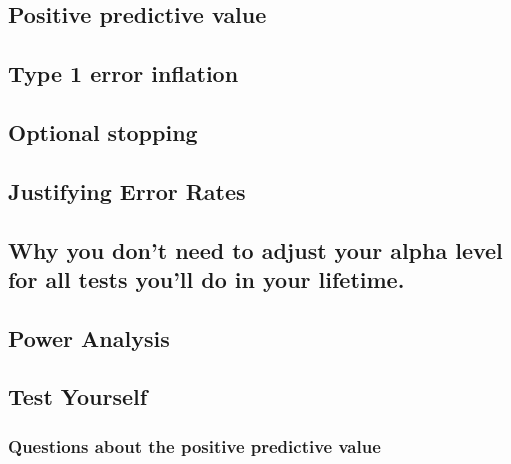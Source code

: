 \documentclass[
  oneside]{krantz}
\begin{document}
\hypertarget{ppv}{%
\subsection{Positive predictive value}\label{ppv}}

\hypertarget{type-1-error-inflation}{%
\subsection{Type 1 error inflation}\label{type-1-error-inflation}}

\hypertarget{optionalstopping}{%
\subsection{Optional stopping}\label{optionalstopping}}

\hypertarget{justifyerrorrate}{%
\subsection{Justifying Error Rates}\label{justifyerrorrate}}

\hypertarget{why-you-dont-need-to-adjust-your-alpha-level-for-all-tests-youll-do-in-your-lifetime.}{%
\subsection{Why you don't need to adjust your alpha level for all tests
you'll do in your
lifetime.}\label{why-you-dont-need-to-adjust-your-alpha-level-for-all-tests-youll-do-in-your-lifetime.}}

\hypertarget{power-analysis}{%
\subsection{Power Analysis}\label{power-analysis}}

\hypertarget{test-yourself-1}{%
\subsection{Test Yourself}\label{test-yourself-1}}

\hypertarget{questions-about-the-positive-predictive-value}{%
\subsubsection{Questions about the positive predictive
value}\label{questions-about-the-positive-predictive-value}}
\end{document}

